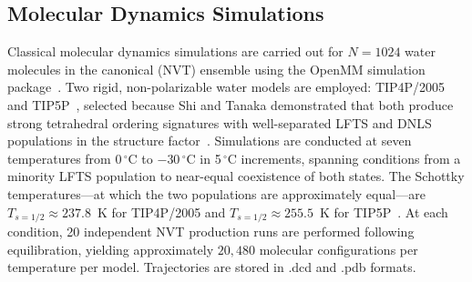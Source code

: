 \documentclass[aps, amsmath,amssymb, reprint, twocolumn,notitlepage,superscriptaddress]{revtex4-2}
\begin{document}
\subsection{Molecular Dynamics Simulations}
Classical molecular dynamics simulations are carried out for $N = 1024$ water molecules in the canonical (NVT) ensemble using the OpenMM simulation package~\cite{eastman_openmm_2015}. Two rigid, non-polarizable water models are employed: TIP4P/2005~\cite{abascal_general_2005} and TIP5P~\cite{mahoney_five-site_2000}, selected because Shi and Tanaka demonstrated that both produce strong tetrahedral ordering signatures with well-separated LFTS and DNLS populations in the structure factor~\cite{shi_direct_2020}. Simulations are conducted at seven temperatures from 0\,$^{\circ}$C to $-30$\,$^{\circ}$C in 5\,$^{\circ}$C increments, spanning conditions from a minority LFTS population to near-equal coexistence of both states. The Schottky temperatures---at which the two populations are approximately equal---are $T_{s=1/2} \approx 237.8$~K for TIP4P/2005 and $T_{s=1/2} \approx 255.5$~K for TIP5P~\cite{shi_direct_2020}. At each condition, 20 independent NVT production runs are performed following equilibration, yielding approximately $20{,}480$ molecular configurations per temperature per model. Trajectories are stored in .dcd and .pdb formats.
\end{document}
